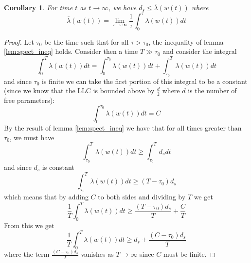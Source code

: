 \documentclass[10pt,a4paper]{amsart}
\newtheorem{corollary*}{Corollary}
\begin{document}
\begin{corollary*}
For time $t$ as $t \to \infty$, we have $d_s \leq \bar{\lambda}(w(t))$ where
    \begin{equation}
        \bar{\lambda}(w(t)) = \lim_{\tau \to \infty} \frac{1}{\tau} \int_0^\tau \lambda(w(t)) dt
    \end{equation}
\end{corollary*}

\begin{proof}
Let $\tau_0$ be the time such that for all $\tau > \tau_0$, the inequality of lemma \ref{lem:spect_ineq} holds. Consider then a time $T \gg \tau_0$ and consider the integral
\begin{equation}
\int_0^T \lambda(w(t)) dt = \int_0^{\tau_0} \lambda(w(t)) dt + \int_{\tau_0}^T \lambda(w(t)) dt
\end{equation}
and since $\tau_0$ is finite we can take the first portion of this integral to be a constant (since we know that the LLC is bounded above by $\frac{d}{2}$ where $d$ is the number of free parameters):
\begin{equation}
    \int_0^{\tau_0} \lambda(w(t)) dt = C
\end{equation}
By the result of lemma \ref{lem:spect_ineq} we have that for all times greater than $\tau_0$, we must have
\begin{equation}
    \int_{\tau_0}^T \lambda(w(t)) dt \geq \int_{\tau_0}^T d_s dt
\end{equation}
and since $d_s$ is constant
\begin{equation}
    \int_{\tau_0}^T \lambda(w(t)) dt \geq (T-\tau_0)d_s
\end{equation}
which means that by adding $C$ to both sides and dividing by $T$ we get
\begin{equation}
    \frac{1}{T}\int_0^T \lambda(w(t)) dt \geq \frac{(T-\tau_0)d_s}{T} + \frac{C}{T}
\end{equation}
From this we get
\begin{equation}
    \frac{1}{T}\int_0^T \lambda(w(t)) dt \geq d_s + \frac{(C-\tau_0)d_s}{T}
\end{equation}
where the term $\frac{(C-\tau_0)d_s}{T}$ vanishes as $T \to \infty$ since $C$ must be finite.
\end{proof}
\end{document}
